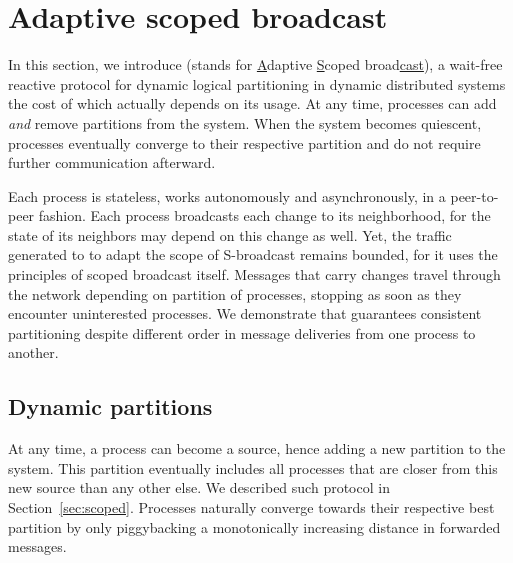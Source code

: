 



\section{Adaptive scoped broadcast}
\label{sec:adaptive}

In this section, we introduce \NAME (stands for \underline{A}daptive
\underline{S}coped broad\underline{cast}), a wait-free reactive
protocol for dynamic logical partitioning in dynamic distributed
systems the cost of which actually depends on its usage. At any time,
processes can add \emph{and} remove partitions from the system. When
the system becomes quiescent, processes eventually converge to their
respective partition and do not require further communication
afterward.

Each process is stateless, works autonomously and asynchronously, in a
peer-to-peer fashion. Each process broadcasts each change to its
neighborhood, for the state of its neighbors may depend on this change
as well. Yet, the traffic generated to to adapt the scope of
S-broadcast remains bounded, for it uses the principles of scoped
broadcast itself. Messages that carry changes travel through the
network depending on partition of processes, stopping as soon as they
encounter uninterested processes. We demonstrate that \NAME guarantees
consistent partitioning despite different order in message deliveries
from one process to another.








\subsection{Dynamic partitions}
At any time, a process can become a source, hence adding a new
partition to the system. This partition eventually includes all
processes that are closer from this new source than any other else. We
described such protocol in Section~\ref{sec:scoped}. Processes
naturally converge towards their respective best partition by only
piggybacking a monotonically increasing distance in forwarded
messages. %

